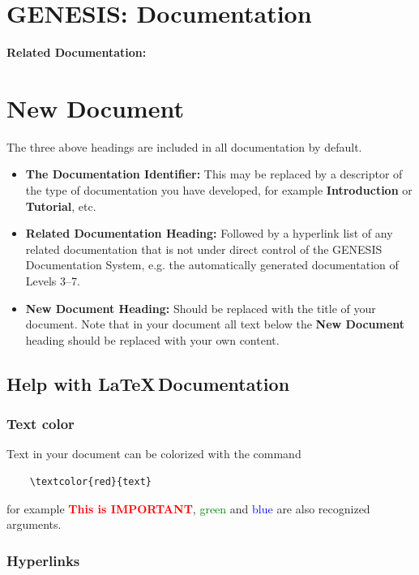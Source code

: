 \documentclass[12pt]{article}
\begin{document}
\section*{GENESIS: Documentation}

{\bf Related Documentation:}

\section*{New Document}

The three above headings are included in all documentation by default.

\begin{itemize}
\item[]  {\bf The Documentation Identifier:} This may be replaced by a descriptor of the type of documentation you have developed, for example {\bf Introduction} or {\bf Tutorial}, etc.
\item[]{\bf Related Documentation Heading:} Followed by a hyperlink list of any related documentation that is not under direct control of the GENESIS Documentation System, e.g. the automatically generated documentation of Levels 3--7.
\item[] {\bf New Document Heading:} Should be replaced with the title of your document. Note that in your document all text below the {\bf New Document} heading should be replaced with your own content.
\end{itemize}

\subsection*{Help with \LaTeX\,Documentation}

\subsubsection*{Text color}

Text in your document can be colorized  with the command
\begin{verbatim}
    \textcolor{red}{text}
\end{verbatim}
for example \textcolor{red}{\bf This is IMPORTANT}, \textcolor{green}{green} and \textcolor{blue}{blue} are also recognized arguments.

\subsubsection*{Hyperlinks}
\end{document}
